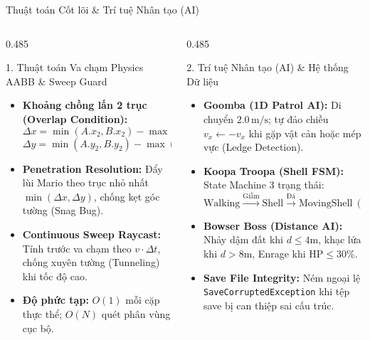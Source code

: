 \documentclass[aspectratio=169, 10pt]{beamer}
\begin{document}
\begin{frame}{Thuật toán Cốt lõi \& Trí tuệ Nhân tạo (AI)}
    \begin{columns}[T]
        \begin{column}{0.485\textwidth}
            \begin{infoCard}{1. Thuật toán Va chạm Physics AABB \& Sweep Guard}
                \begin{itemize}\scriptsize\setlength{\itemsep}{2pt}
                    \item \textbf{Khoảng chồng lấn 2 trục (Overlap Condition):}
                    $$\Delta x = \min(A.x_2, B.x_2) - \max(A.x_1, B.x_1) > 0$$
                    $$\Delta y = \min(A.y_2, B.y_2) - \max(A.y_1, B.y_1) > 0$$
                    \item \textbf{Penetration Resolution:} Đẩy lùi Mario theo trục nhỏ nhất $\min(\Delta x, \Delta y)$, chống kẹt góc tường (Snag Bug).
                    \item \textbf{Continuous Sweep Raycast:} Tính trước va chạm theo $v \cdot \Delta t$, chống xuyên tường (Tunneling) khi tốc độ cao.
                    \item \textbf{Độ phức tạp:} $O(1)$ mỗi cặp thực thể; $O(N)$ quét phân vùng cục bộ.
                \end{itemize}
            \end{infoCard}
        \end{column}

        \begin{column}{0.485\textwidth}
            \begin{coreCard}{2. Trí tuệ Nhân tạo (AI) \& Hệ thống Dữ liệu}
                \begin{itemize}\scriptsize\setlength{\itemsep}{2pt}
                    \item \textbf{Goomba (1D Patrol AI):} Di chuyển $2.0\,\text{m/s}$; tự đảo chiều $v_x \leftarrow -v_x$ khi gặp vật cản hoặc mép vực (Ledge Detection).
                    \item \textbf{Koopa Troopa (Shell FSM):} State Machine 3 trạng thái:
                    $$\text{Walking} \xrightarrow{\text{Giẫm}} \text{Shell} \xrightarrow{\text{Đá}} \text{MovingShell}\ (12\,\text{m/s})$$
                    \item \textbf{Bowser Boss (Distance AI):} Nhảy dậm đất khi $d \le 4\text{m}$, khạc lửa khi $d > 8\text{m}$, Enrage khi $\text{HP} \le 30\%$.
                    \item \textbf{Save File Integrity:} Ném ngoại lệ \texttt{SaveCorruptedException} khi tệp save bị can thiệp sai cấu trúc.
                \end{itemize}
            \end{coreCard}
        \end{column}
    \end{columns}
\end{frame}
\end{document}

